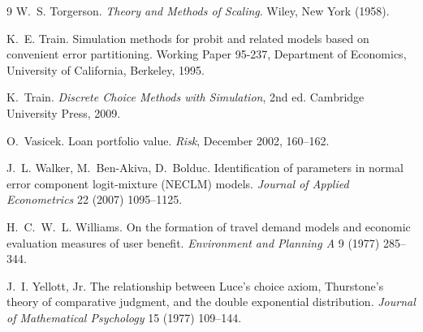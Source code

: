 \documentclass[12pt]{article}
\theoremstyle{remark}
\begin{document}
\begin{thebibliography}{9}
 W.~S. Torgerson. \emph{Theory
and Methods of Scaling}. Wiley, New York (1958).

 K.~E. Train. Simulation methods for
probit and related models based on convenient error partitioning.
Working Paper 95-237, Department of Economics, University of
California, Berkeley, 1995.

 K.~Train. \emph{Discrete Choice Methods with Simulation},
2nd ed. Cambridge University Press, 2009.

 O.~Vasicek. Loan portfolio value.
\emph{Risk}, December 2002, 160--162.

J.~L. Walker, M.~Ben-Akiva, D.~Bolduc. Identification of parameters in
normal error component logit-mixture (NECLM) models. \emph{Journal of
Applied Econometrics} 22 (2007) 1095--1125.

 H.~C.~W.~L. Williams. On the
formation of travel demand models and economic evaluation measures of
user benefit. \emph{Environment and Planning A} 9 (1977) 285--344.

 J.~I. Yellott, Jr. The
relationship between Luce's choice axiom, Thurstone's theory of
comparative judgment, and the double exponential distribution.
\emph{Journal of Mathematical Psychology} 15 (1977) 109--144.

\end{thebibliography}
\end{document}
